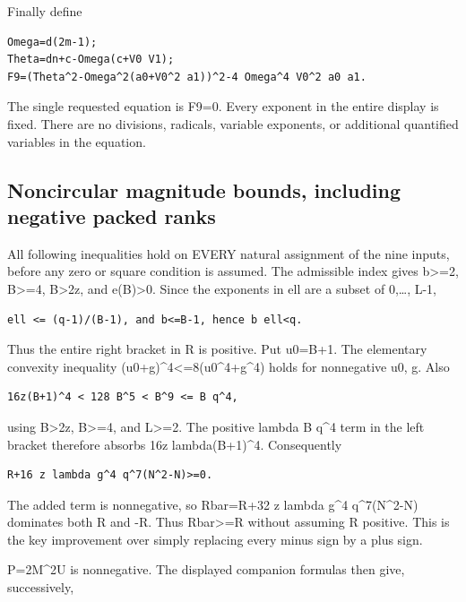 \documentclass[
  10pt,
]{article}
\begin{document}
Finally define

\begin{verbatim}
Omega=d(2m-1);
Theta=dn+c-Omega(c+V0 V1);
F9=(Theta^2-Omega^2(a0+V0^2 a1))^2-4 Omega^4 V0^2 a0 a1.
\end{verbatim}

The single requested equation is F9=0. Every exponent in the entire
display is fixed. There are no divisions, radicals, variable exponents,
or additional quantified variables in the equation.

\subsection{Noncircular magnitude bounds, including negative packed
ranks}\label{noncircular-magnitude-bounds-including-negative-packed-ranks}

All following inequalities hold on EVERY natural assignment of the nine
inputs, before any zero or square condition is assumed. The admissible
index gives b\textgreater=2, B\textgreater=4, B\textgreater2z, and
e(B)\textgreater0. Since the exponents in ell are a subset of
0,\ldots, L-1,

\begin{verbatim}
ell <= (q-1)/(B-1), and b<=B-1, hence b ell<q.
\end{verbatim}

Thus the entire right bracket in R is positive. Put u0=B+1. The
elementary convexity inequality (u0+g)\^{}4\textless=8(u0\^{}4+g\^{}4)
holds for nonnegative u0, g. Also

\begin{verbatim}
16z(B+1)^4 < 128 B^5 < B^9 <= B q^4,
\end{verbatim}

using B\textgreater2z, B\textgreater=4, and L\textgreater=2. The
positive lambda B q\^{}4 term in the left bracket therefore absorbs 16z
lambda(B+1)\^{}4. Consequently

\begin{verbatim}
R+16 z lambda g^4 q^7(N^2-N)>=0.
\end{verbatim}

The added term is nonnegative, so Rbar=R+32 z lambda g\^{}4
q\^{}7(N\^{}2-N) dominates both R and -R. Thus
Rbar\textgreater=\textbar R\textbar{} without assuming R positive. This
is the key improvement over simply replacing every minus sign by a plus
sign.

P=2M\^{}2U is nonnegative. The displayed companion formulas then give,
successively,
\end{document}
